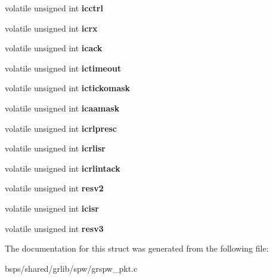 \begin{DoxyCompactItemize}
\item 
\mbox{\label{structgrspw__regs_ad0bc39726392bc3dfd6961aa67b816e8}} 
volatile unsigned int {\bfseries icctrl}
\item 
\mbox{\label{structgrspw__regs_a67d623bcd7c12982f9fac425cec1c488}} 
volatile unsigned int {\bfseries icrx}
\item 
\mbox{\label{structgrspw__regs_a1bb985f26ec813eb8d14fd05dc416849}} 
volatile unsigned int {\bfseries icack}
\item 
\mbox{\label{structgrspw__regs_acff688159a517156aa50df2f5ce5974c}} 
volatile unsigned int {\bfseries ictimeout}
\item 
\mbox{\label{structgrspw__regs_a5c9d979e5c411191633c78c21a02b2bd}} 
volatile unsigned int {\bfseries ictickomask}
\item 
\mbox{\label{structgrspw__regs_a27293550873d17cc7a1c27cf801cd6be}} 
volatile unsigned int {\bfseries icaamask}
\item 
\mbox{\label{structgrspw__regs_ae0b1d596adae108730fbdb4def626989}} 
volatile unsigned int {\bfseries icrlpresc}
\item 
\mbox{\label{structgrspw__regs_a42ffd7b8d63a4224c1fa3882852f79bf}} 
volatile unsigned int {\bfseries icrlisr}
\item 
\mbox{\label{structgrspw__regs_af9acf133bf8b7262be7759a70c6b3b57}} 
volatile unsigned int {\bfseries icrlintack}
\item 
\mbox{\label{structgrspw__regs_a5efb29f4e384f0c24e391434a279fab4}} 
volatile unsigned int {\bfseries resv2}
\item 
\mbox{\label{structgrspw__regs_a202cfb9ab36575fa948d3f18bf226836}} 
volatile unsigned int {\bfseries icisr}
\item 
\mbox{\label{structgrspw__regs_a7f928f1864069d612636496bc016658c}} 
volatile unsigned int {\bfseries resv3}
\end{DoxyCompactItemize}


The documentation for this struct was generated from the following file\+:\begin{DoxyCompactItemize}
\item 
bsps/shared/grlib/spw/grspw\+\_\+pkt.\+c\end{DoxyCompactItemize}
